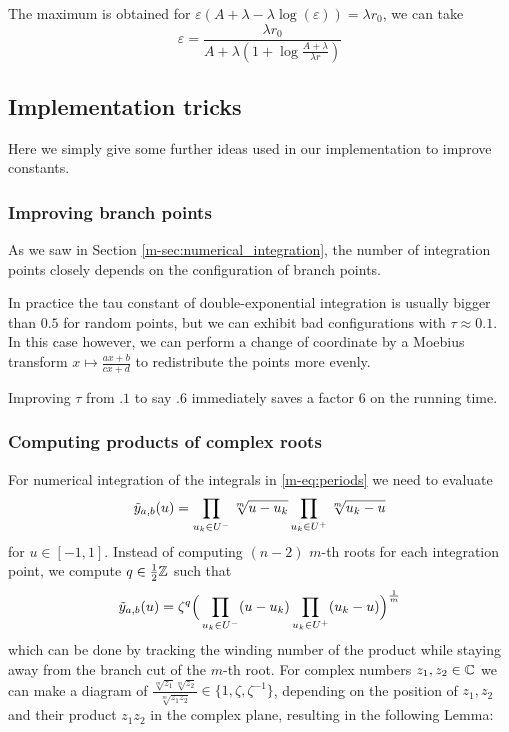 \documentclass[main.tex]{subfiles}
\begin{document}
   The maximum is obtained for $ε(A+λ-λ\log(ε))=λr_0$,
   we can take
   \[ ε = \frac{λr_0}{A+λ(1+\log\frac{A+λ}{λr})} \]
   
   \subsection{Implementation tricks}

   Here we simply give some further ideas used in our implementation to improve constants.

   \subsubsection{Improving branch points}

   As we saw in Section \ref{m-sec:numerical_integration}, the number of integration points
   closely depends on the configuration of branch points.

   In practice the tau constant of double-exponential integration is usually bigger than $0.5$
   for random points, but we can exhibit bad configurations with $τ\approx 0.1$. In this case
   however, we can perform a change of coordinate by a Moebius transform
   $x\mapsto \frac{ax+b}{cx+d}$ to redistribute the points more evenly.

   Improving $τ$ from $.1$ to say $.6$ immediately saves a factor $6$ on the running time.

  \subsubsection{Computing products of complex roots}\label{subsec:computing_roots}

  For numerical integration of the integrals in \eqref{m-eq:periods}
  we need to evaluate
  \begin{equation*}
   \tilde{y}_{a,b}(u) = \prod_{u_k\in U^-} \sqrt[m]{u-u_k}\prod_{u_k\in U^+}\sqrt[m]{u_k-u}
  \end{equation*}
  for $u \in [-1,1]$. Instead of computing $(n-2)$ $m$-th roots for each
  integration point, we compute $q \in \frac12\mathbb{Z}$ such that
  \begin{equation*}
   \tilde{y}_{a,b}(u) = \zeta^q \Big( \prod_{u_k\in U^-}(u-u_k) \prod_{u_k\in U^+} (u_k-u) \Big)^{\frac{1}{m}}
  \end{equation*}
 which can be done by tracking
  the winding number of the product while staying away from the branch cut
  of the $m$-th root.
  For complex numbers $z_1,z_2 \in \mathbb{C}$ we can make a diagram of
  $\frac{\sqrt[m]{z_1}\sqrt[m]{z_2}}{\sqrt[m]{z_1z_2}} \in \{ 1, \zeta,
  \zeta^{-1} \}$, depending on the position of $z_1,z_2$ and their product
  $z_1z_2$ in the complex plane, resulting in the following Lemma:
\end{document}
